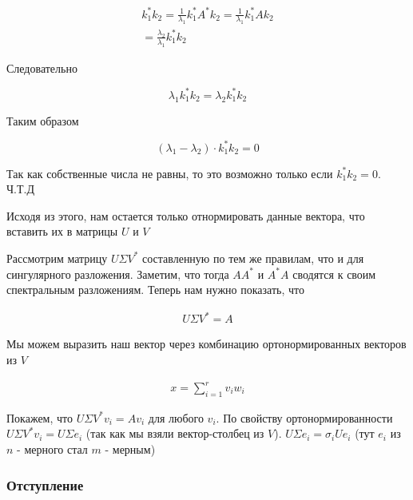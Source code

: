 \documentclass{article}
\begin{document}
    \[
    \begin{gathered}
        k_{1}^{*} k_{2} = \frac{1}{\lambda_{1}} k_{1}^{*} A^{*} k_{2} = \frac{1}{\lambda_{1}} k_{1}^{*} A k_{2} \\
        = \frac{\lambda_{2}}{\lambda_{1}} k_{1}^{*} k_{2}
    \end{gathered}
    \]

    Следовательно

    \begin{equation}
        \lambda_{1} k_{1}^{*} k_{2} = \lambda_{2} k_{1}^{*} k_{2}
    \end{equation}

    Таким образом 

    \begin{equation}
        (\lambda_{1} - \lambda_{2}) \cdot k_{1}^{*} k_{2} = 0
    \end{equation}

    Так как собственные числа не равны, то это возможно только если $k_{1}^{*} k_{2} = 0$. Ч.Т.Д 

    Исходя из этого, нам остается только отнормировать данные вектора, что вставить их в матрицы $U$ и $V$ 

    \quad 

    Рассмотрим матрицу $U \Sigma V^{*}$ составленную по тем же правилам, что и для сингулярного разложения.
    Заметим, что тогда $AA^{*}$ и $A^{*}A$ сводятся к своим спектральным разложениям. Теперь нам нужно показать, что 

    \begin{eqnarray}
        U \Sigma V^{*} = A
    \end{eqnarray}

    Мы можем выразить наш вектор через комбинацию ортонормированных векторов из $V$ 

    \begin{eqnarray}
        x = \sum_{i=1}^{r} v_{i} w_{i}
    \end{eqnarray}

    Покажем, что $U \Sigma V^{*} v_{i} = A v_{i}$ для любого $v_{i}$. По свойству ортонормированности 
    $U \Sigma V^{*} v_{i} = U \Sigma e_{i}$ (так как мы взяли вектор-столбец из $V$). 
    $U \Sigma e_{i} = \sigma_{i} U e_{i}$ (тут $e_{i}$ из $n$ - мерного стал $m$ - мерным)





    \subsubsection{Отступление}
\end{document}
